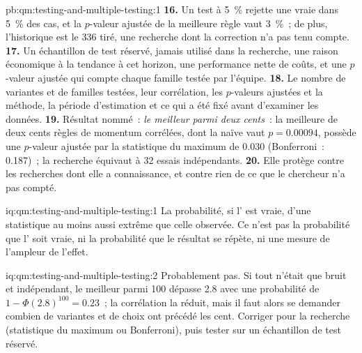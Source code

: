 \begin{solution}{pb:qm:testing-and-multiple-testing:1}
\textbf{16.} Un test à 5~\% rejette une  vraie dans 5~\% des cas, et la $p$-valeur ajustée de la meilleure règle vaut 3~\%~; de plus, l'historique est le
336 tiré, une recherche dont la correction n'a pas tenu compte.
\textbf{17.} Un échantillon de test réservé, jamais utilisé dans la recherche, une raison économique à la tendance à cet horizon, une performance nette de coûts, et une
$p$-valeur ajustée qui compte chaque famille testée par l'équipe.
\textbf{18.} Le nombre de variantes et de familles testées, leur corrélation, les $p$-valeurs ajustées et la méthode, la période d'estimation et
ce qui a été fixé avant d'examiner les données.
\textbf{19.} Résultat nommé~: \emph{le meilleur parmi deux cents}~: la meilleure de deux cents règles de momentum corrélées, dont la  naïve vaut $p = 0.00094$, possède une
$p$-valeur ajustée par la statistique du maximum de 0.030 (Bonferroni~: 0.187)~; la recherche équivaut à 32 essais indépendants.
\textbf{20.} Elle protège contre les recherches dont elle a connaissance, et contre rien de ce que le chercheur n'a pas compté.
\end{solution}

\begin{solution}{iq:qm:testing-and-multiple-testing:1}
La probabilité, si l' est vraie, d'une statistique au moins aussi extrême que celle observée. Ce n'est pas la probabilité que
l' soit vraie, ni la probabilité que le résultat se répète, ni une mesure de l'ampleur de l'effet.
\end{solution}

\begin{solution}{iq:qm:testing-and-multiple-testing:2}
Probablement pas. Si tout n'était que bruit et indépendant, le meilleur parmi 100 dépasse 2.8 avec une probabilité de $1 - \Phi(2.8)^{100} = 0.23$~;
la corrélation la réduit, mais il faut alors se demander combien de variantes et de choix ont précédé les cent. Corriger pour la recherche (statistique du maximum ou
Bonferroni), puis tester sur un échantillon de test réservé.
\end{solution}

